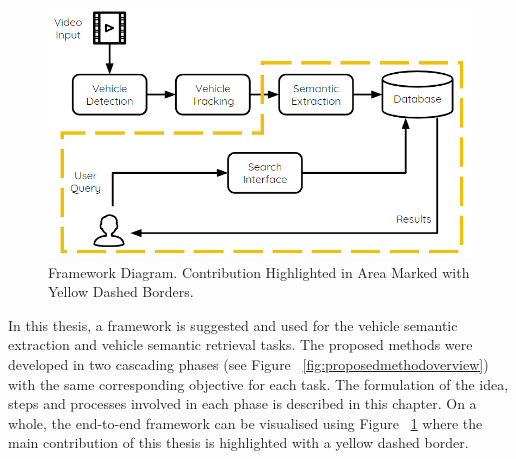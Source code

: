 \begin{figure}[hbt!]\centering
\includegraphics[width=.9\textwidth]{image/new/framework_new.PNG}
\caption{Framework Diagram. Contribution Highlighted in Area Marked with Yellow Dashed Borders.}
\label{fig:framework}
\end{figure}

In this thesis, a framework is suggested and used for the vehicle semantic extraction and vehicle semantic retrieval tasks.
The proposed methods were developed in two cascading phases (see Figure ~\ref{fig:proposedmethodoverview}) with the same corresponding objective for each task.
The formulation of the idea, steps and processes involved in each phase is described in this chapter.
On a whole, the end-to-end framework can be visualised using Figure ~\ref{fig:framework} where the main contribution of this thesis is highlighted with a yellow dashed border.

\vspace{1em}
